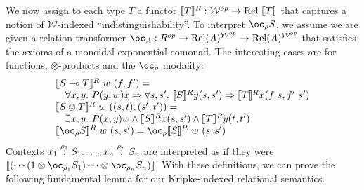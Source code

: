 We now assign to each type $T$ a functor
$\sem{T}^R : \mathcal{W}^{op} \to \mathrm{Rel}~\sem{T}$ that captures
a notion of $\mathcal{W}$-indexed ``indistinguishability''. To
interpret $\oc_\rho S$, we assume we are given a relation transformer
$\oc_A : R^{op} \to \mathrm{Rel}(A)^{\mathcal{W}^{op}} \to
\mathrm{Rel}(A)^{\mathcal{W}^{op}}$
that satisfies the axioms of a monoidal exponential comonad. The
interesting cases are for functions, $\otimes$-products and the
$\oc_\rho$ modality:
\begin{displaymath}
  \begin{array}{l}
    \llbracket \fun{S}{T} \rrbracket^R~w~(f,f') = \\
    \quad \forall x,y.~P(y,w)x \Rightarrow \forall s,s'.~\llbracket S \rrbracket^R y (s, s') \Rightarrow \llbracket
    T \rrbracket^R x (f~s, f'~s')
    \\
    \llbracket \tensor{S}{T} \rrbracket^R~w~((s, t), (s', t')) =\\
    \quad
    \exists x,y.~P(x,y)w \wedge \llbracket S \rrbracket^R x (s, s') \wedge
    \llbracket T \rrbracket^R y (t, t')
    \\
    \llbracket \excl{\rho}{S} \rrbracket^R~w~(s,s')=
    \oc_\rho \llbracket S \rrbracket^R~w~(s,s')\\
  \end{array}
\end{displaymath}
Contexts
$\ctxvar{x_1}{S_1}{\rho_1}, \ldots, \ctxvar{x_n}{S_n}{\rho_n}$ are
interpreted as if they were
$\sem{(\cdots(1 \otimes \oc_{\rho_1}S_1) \cdots \otimes \oc_{\rho_n}
  S_n)}$.
With these definitions, we can prove the following fundamental lemma
for our Kripke-indexed relational semantics.





